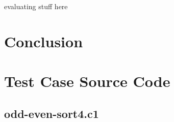 \documentclass{article}
\begin{document}
evaluating stuff here



\section{Conclusion}

{}


\appendix
\section{Test Case Source Code}
\label{sec:codez}
\subsection{odd-even-sort4.c1}
\small
\end{document}
